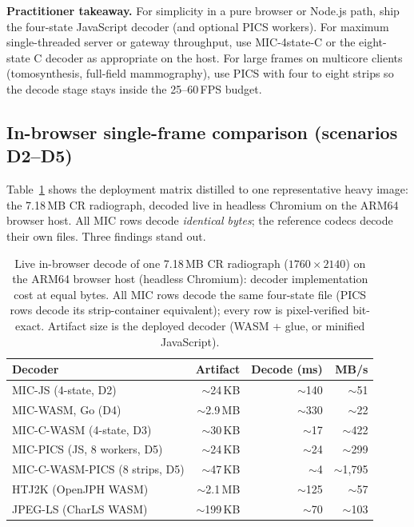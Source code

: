 \documentclass[journal]{IEEEtran}
\begin{document}
\textbf{Practitioner takeaway.} For simplicity in a pure browser or Node.js
path, ship the four-state JavaScript decoder (and optional PICS workers).
For maximum single-threaded server or gateway throughput, use MIC-4state-C
or the eight-state C decoder as appropriate on the host. For large frames on
multicore clients (tomosynthesis, full-field mammography), use PICS with
four to eight strips so the decode stage stays inside the 25--60\,FPS
budget.

\subsection{In-browser single-frame comparison (scenarios D2--D5)}

Table~\ref{tab:browser-single} shows the deployment matrix distilled to one
representative heavy image: the 7.18\,MB CR radiograph, decoded live in
headless Chromium on the ARM64 browser host. All MIC rows decode
\emph{identical bytes}; the reference codecs decode their own files. Three
findings stand out.

\begin{table}[htbp]
\centering
\caption{Live in-browser decode of one 7.18\,MB CR radiograph
($1760{\times}2140$) on the ARM64 browser host (headless Chromium): decoder
implementation cost at equal bytes. All MIC rows decode the same four-state
file (PICS rows decode its strip-container equivalent); every row is
pixel-verified bit-exact. Artifact size is the deployed decoder (WASM +
glue, or minified JavaScript).}
\label{tab:browser-single}
\scriptsize
\setlength{\tabcolsep}{3.5pt}
\begin{tabular}{lrrr}
\toprule
Decoder & Artifact & Decode (ms) & MB/s \\
\midrule
MIC-JS (4-state, D2)        & ${\sim}$24\,KB  & ${\sim}$140 & ${\sim}$51 \\
MIC-WASM, Go (D4)           & ${\sim}$2.9\,MB & ${\sim}$330 & ${\sim}$22 \\
MIC-C-WASM (4-state, D3)    & ${\sim}$30\,KB  & ${\sim}$17  & ${\sim}$422 \\
MIC-PICS (JS, 8 workers, D5)& ${\sim}$24\,KB  & ${\sim}$24  & ${\sim}$299 \\
MIC-C-WASM-PICS (8 strips, D5) & ${\sim}$47\,KB & ${\sim}$4 & ${\sim}$1{,}795 \\
\midrule
HTJ2K (OpenJPH WASM)        & ${\sim}$2.1\,MB & ${\sim}$125 & ${\sim}$57 \\
JPEG-LS (CharLS WASM)       & ${\sim}$199\,KB & ${\sim}$70  & ${\sim}$103 \\
\bottomrule
\end{tabular}
\end{table}
\end{document}
